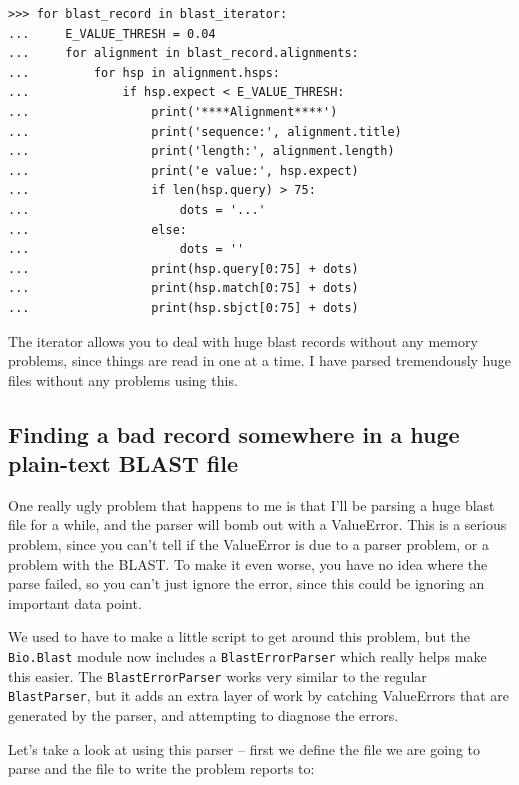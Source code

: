 \documentclass{report}
\begin{document}
\begin{verbatim}
>>> for blast_record in blast_iterator:
...     E_VALUE_THRESH = 0.04
...     for alignment in blast_record.alignments:
...         for hsp in alignment.hsps:
...             if hsp.expect < E_VALUE_THRESH:
...                 print('****Alignment****')
...                 print('sequence:', alignment.title)
...                 print('length:', alignment.length)
...                 print('e value:', hsp.expect)
...                 if len(hsp.query) > 75:
...                     dots = '...'
...                 else:
...                     dots = ''
...                 print(hsp.query[0:75] + dots)
...                 print(hsp.match[0:75] + dots)
...                 print(hsp.sbjct[0:75] + dots)
\end{verbatim}


The iterator allows you to deal with huge blast records without any memory problems, since things are read in one at a time. I have parsed tremendously huge files without any problems using this.

\subsection{Finding a bad record somewhere in a huge plain-text BLAST file}

One really ugly problem that happens to me is that I'll be parsing a huge blast file for a while, and the parser will bomb out with a ValueError. This is a serious problem, since you can't tell if the ValueError is due to a parser problem, or a problem with the BLAST. To make it even worse, you have no idea where the parse failed, so you can't just ignore the error, since this could be ignoring an important data point.

We used to have to make a little script to get around this problem, but the \verb|Bio.Blast| module now includes a \verb|BlastErrorParser| which really helps make this easier. The \verb|BlastErrorParser| works very similar to the regular \verb|BlastParser|, but it adds an extra layer of work by catching ValueErrors that are generated by the parser, and attempting to diagnose the errors.

Let's take a look at using this parser -- first we define the file we are going to parse and the file to write the problem reports to:
\end{document}
